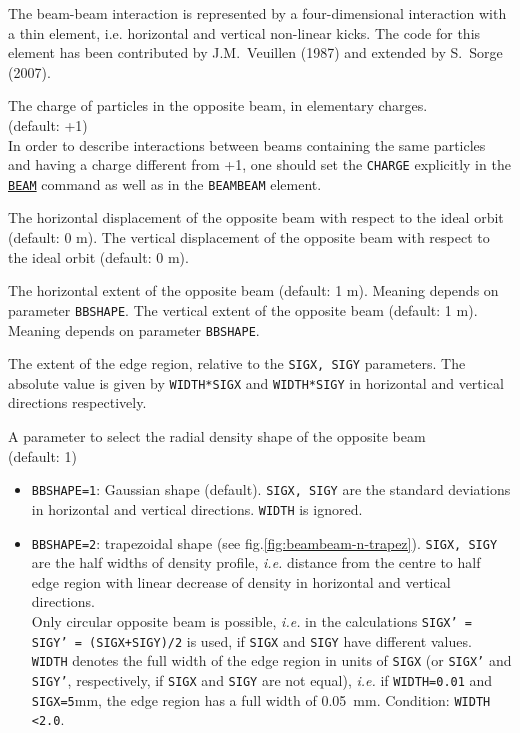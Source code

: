The beam-beam interaction is represented by a four-dimensional
interaction with a thin element, i.e. horizontal and vertical non-linear kicks.
The code for this element has been contributed by J.M.~Veuillen (1987)
and extended by S.~Sorge (2007).

\begin{madlist}
     The charge of particles in the opposite beam, in elementary charges.
     \\ (default: +1) \\
     In order to describe interactions between beams containing the same
     particles and having a charge different from +1, one should set the
     \texttt{CHARGE} explicitly in the
     \hyperref[sec:beam]{\texttt{BEAM}} command as well as in the
     \texttt{BEAMBEAM} element.

     The horizontal displacement of the opposite beam with respect to
     the ideal orbit (default: 0 m).
     The vertical displacement of the opposite beam with respect to
     the ideal orbit (default: 0 m).

     The horizontal extent of the opposite beam (default: 1 m).
     Meaning depends on parameter \texttt{BBSHAPE}.
     The vertical extent of the opposite beam (default: 1 m).
     Meaning depends on parameter \texttt{BBSHAPE}.

    The extent of the edge region, relative to the
     \texttt{SIGX, SIGY} parameters. The absolute value is given by
     \texttt{WIDTH*SIGX} and \texttt{WIDTH*SIGY} in horizontal and
     vertical directions respectively.


    A parameter to select the radial density shape of the
     opposite beam \\ (default: 1)
     \begin{itemize}
       \item  \texttt{BBSHAPE=1}: Gaussian shape (default).
         \texttt{SIGX, SIGY} are the standard deviations in horizontal
         and vertical directions. \texttt{WIDTH} is ignored.

       \item  \texttt{BBSHAPE=2}: trapezoidal shape (see
       fig.\ref{fig:beambeam-n-trapez}). \texttt{SIGX, SIGY} are the half widths of
       density profile, \textsl{i.e.} distance from the centre to half
       edge region with linear decrease of density in horizontal and
       vertical directions. \\
       Only circular opposite beam is possible, \textsl{i.e.} in the
       calculations \texttt{SIGX' = SIGY' = (SIGX+SIGY)/2} is used, if
       \texttt{SIGX} and \texttt{SIGY} have different values. \\
       \texttt{WIDTH} denotes the full width of the edge
       region in units of \texttt{SIGX} (or \texttt{SIGX'} and \texttt{SIGY'},
       respectively, if \texttt{SIGX} and \texttt{SIGY} are not equal), \textsl{i.e.}
       if \texttt{WIDTH=0.01} and \texttt{SIGX=5}mm, the edge region has a full
       width of 0.05\ mm.  Condition: \texttt{WIDTH \textless 2.0}.


\end{itemize}
\end{madlist}
